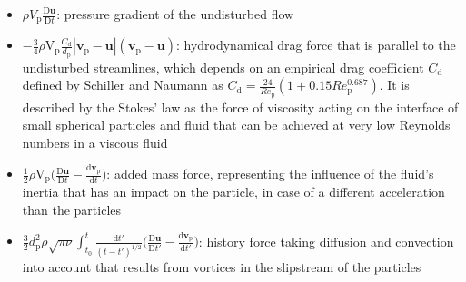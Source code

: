\documentclass[11pt,a4paper,openany,oneside,parskip=half*]{article}
\renewcommand*\vec[1]{\boldsymbol{#1}}
\begin{document}
\begin{itemize} 
\item  $\rho V_\mathrm{p}\frac{\mathrm{D}\vec{u}}{\mathrm{D}t}$: \newline
pressure gradient of the undisturbed flow
\item  $-\frac{3}{4}\rho \mathrm{V}_\mathrm{p} \frac{C_\mathrm{d}}{d_\mathrm{p}}|\vec{v}_\mathrm{p}-    \vec{u}|(\vec{v}_\mathrm{p}-\vec{u})$:\newline
hydrodynamical drag force that is parallel to the undisturbed streamlines, which depends on an empirical drag coefficient $C_{\mathrm{d}}$ defined by Schiller and Naumann as
$C_\mathrm{d} = \frac{24}{Re_\mathrm{p}}(1+0.15Re_\mathrm{p}^\mathrm{0.687})$.
It is described by the Stokes' law as the force of viscosity acting on the interface of small spherical particles and fluid that can be achieved at very low Reynolds numbers in a viscous fluid

\item $\frac{1}{2}\rho \mathrm{V}_\mathrm{p} \biggl(\frac{\mathrm{D}\vec{u}}{\mathrm{D}t}-\frac{\mathrm{d}\vec{v}_\mathrm{p}}{\mathrm{d}t}\biggl)$:\newline
added mass force, representing the influence of the fluid's inertia that has an impact on the particle, in case of a different acceleration than the particles
\item $\frac{3}{2}d_\mathrm{p}^\mathrm{2}\rho\sqrt{\pi\nu}\int_{t_\mathrm{0}}^{t} \frac{\mathrm{d}t'}{(t-t')^\mathrm{1/2}} \biggl(\frac{\mathrm{D}\vec{u}}{\mathrm{D}t'}- \frac{\mathrm{d}\vec{v}_\mathrm{p}}{\mathrm{d}t'}\biggl) $: \newline
history force taking diffusion and convection into account that results from vortices in the slipstream of the particles
\end{itemize}
\end{document}
